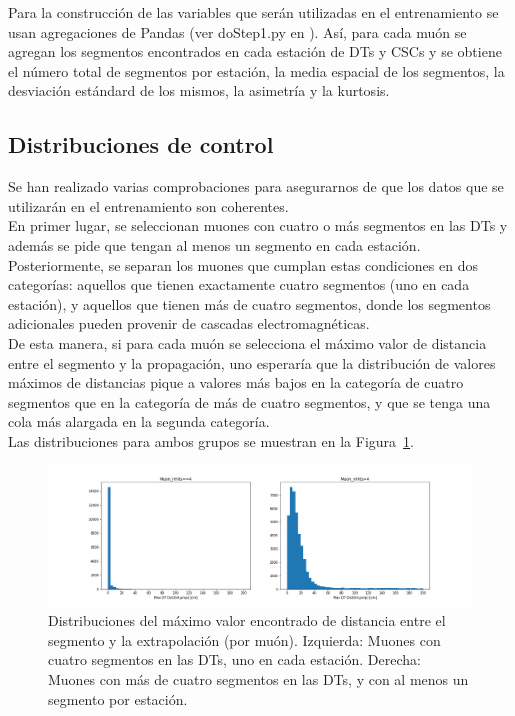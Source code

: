 Para la construcci\'on de las variables que ser\'an utilizadas en el entrenamiento se usan agregaciones de Pandas (ver doStep1.py en \cite{processor}). As\'i, para cada mu\'on se agregan los segmentos encontrados en cada estaci\'on de DTs y CSCs y se obtiene el n\'umero total de segmentos por estaci\'on, la media espacial de los segmentos, la desviaci\'on est\'andard de los mismos, la asimetr\'ia y la kurtosis.



\subsection{Distribuciones de control}\label{sec:plots}

Se han realizado varias comprobaciones para asegurarnos de que los datos que se utilizar\'an en el entrenamiento son coherentes. \\

En primer lugar, se seleccionan muones con cuatro o m\'as segmentos en las DTs y adem\'as se pide que tengan al menos un segmento en cada estaci\'on. Posteriormente, se separan los muones que cumplan estas condiciones en dos categor\'ias: aquellos que tienen exactamente cuatro segmentos (uno en cada estaci\'on), y aquellos que tienen m\'as de cuatro segmentos, donde los segmentos adicionales pueden provenir de cascadas electromagn\'eticas. \\
De esta manera, si para cada mu\'on se selecciona el m\'aximo valor de distancia entre el segmento y la propagaci\'on, uno esperar\'ia que la distribuci\'on de valores m\'aximos de distancias pique a valores m\'as bajos en la categor\'ia de cuatro segmentos que en la categor\'ia de m\'as de cuatro segmentos, y que se tenga una cola m\'as alargada en la segunda categor\'ia. \\
Las distribuciones para ambos grupos se muestran en la Figura~\ref{fig:data_dist}. \\

\begin{figure}[h]
\centering
\includegraphics[width=1.1\textwidth]{figures/data_simple_dist_postCleaning.png}
\caption{Distribuciones del m\'aximo valor encontrado de distancia entre el segmento y la extrapolaci\'on (por mu\'on). Izquierda: Muones con cuatro segmentos en las DTs, uno en cada estaci\'on. Derecha: Muones con m\'as de cuatro segmentos en las DTs, y con al menos un segmento por estaci\'on.}
\label{fig:data_dist}        
\end{figure}


